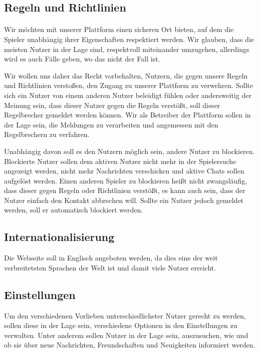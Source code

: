 \subsection{Regeln und Richtlinien}
\paragraph{}
Wir möchten mit unserer Plattform einen sicheren Ort bieten, auf dem die Spieler unabhängig ihrer Eigenschaften respektiert werden. Wir glauben, dass die meisten Nutzer in der Lage sind, respektvoll miteinander umzugehen, allerdings wird es auch Fälle geben, wo das nicht der Fall ist.

Wir wollen uns daher das Recht vorbehalten, Nutzern, die gegen unsere Regeln und Richtlinien verstoßen, den Zugang zu unserer Plattform zu verwehren. Sollte sich ein Nutzer von einem anderen Nutzer beleidigt fühlen oder andersweitig der Meinung sein, dass dieser Nutzer gegen die Regeln verstößt, soll dieser Regelbrecher gemeldet werden können. Wir als Betreiber der Plattform sollen in der Lage sein, die Meldungen zu verarbeiten und angemessen mit den Regelbrechern zu verfahren.

Unabhängig davon soll es den Nutzern möglich sein, andere Nutzer zu blockieren. Blockierte Nutzer sollen dem aktiven Nutzer nicht mehr in der Spielersuche angezeigt werden, nicht mehr Nachrichten verschicken und aktive Chats sollen aufgelöst werden. Einen anderen Spieler zu blockieren heißt nicht zwangsläufig, dass dieser gegen Regeln oder Richtlinien verstößt, es kann auch sein, dass der Nutzer einfach den Kontakt abbrechen will. Sollte ein Nutzer jedoch gemeldet werden, soll er automatisch blockiert werden.

\subsection{Internationalisierung}
Die Webseite soll in Englisch angeboten werden, da dies eine der weit verbreitetsten Sprachen der Welt ist und damit viele Nutzer erreicht.

\subsection{Einstellungen}
Um den verschiedenen Vorlieben unterschiedlichster Nutzer gerecht zu werden, sollen diese in der Lage sein, verschiedene Optionen in den Einstellungen zu verwalten. Unter anderem sollen Nutzer in der Lage sein, auszusuchen, wie und ob sie über neue Nachrichten, Freundschaften und Neuigkeiten informiert werden.

